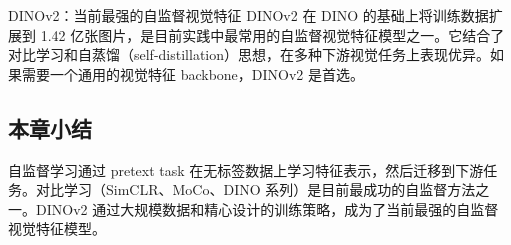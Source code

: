 \begin{knowledgebox}{DINOv2：当前最强的自监督视觉特征}
DINOv2 在 DINO 的基础上将训练数据扩展到 1.42 亿张图片，是目前实践中最常用的自监督视觉特征模型之一。它结合了对比学习和自蒸馏（self-distillation）思想，在多种下游视觉任务上表现优异。如果需要一个通用的视觉特征 backbone，DINOv2 是首选。
\end{knowledgebox}

\subsection{本章小结}

自监督学习通过 pretext task 在无标签数据上学习特征表示，然后迁移到下游任务。对比学习（SimCLR、MoCo、DINO 系列）是目前最成功的自监督方法之一。DINOv2 通过大规模数据和精心设计的训练策略，成为了当前最强的自监督视觉特征模型。


